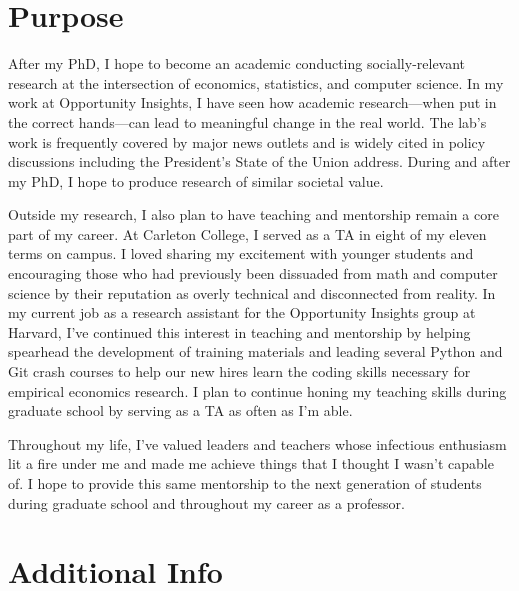 \documentclass[header=false]{grad-statement}
\begin{document}
\section{Purpose}


After my PhD, I hope to become an academic conducting socially-relevant research at the intersection of economics, statistics, and computer science.
In my work at Opportunity Insights, I have seen how academic research---when put in the correct hands---can lead to meaningful change in the real world.
The lab's work is frequently covered by major news outlets and is widely cited in policy discussions including the President's State of the Union address.
During and after my PhD, I hope to produce research of similar societal value.

Outside my research, I also plan to have teaching and mentorship remain a core part of my career.
At Carleton College, I served as a TA in eight of my eleven terms on campus.
I loved sharing my excitement with younger students and encouraging those who had previously been dissuaded from math and computer science by their reputation as overly technical and disconnected from reality.
In my current job as a research assistant for the Opportunity Insights group at Harvard, I've continued this interest in teaching and mentorship by helping spearhead the development of training materials and leading several Python and Git crash courses to help our new hires learn the coding skills necessary for empirical economics research.
I plan to continue honing my teaching skills during graduate school by serving as a TA as often as I'm able.

Throughout my life, I've valued leaders and teachers whose infectious enthusiasm lit a fire under me and made me achieve things that I thought I wasn't capable of.
I hope to provide this same mentorship to the next generation of students during graduate school and throughout my career as a professor.

\section{Additional Info}
\end{document}
